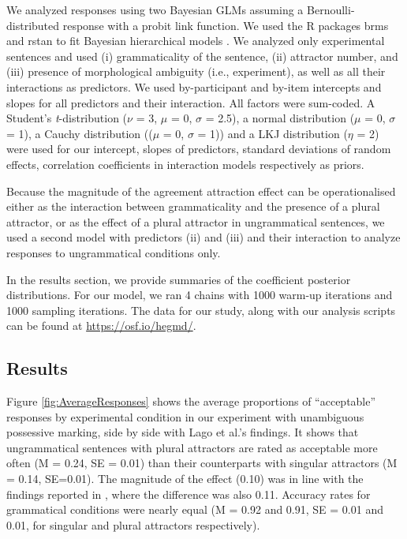 \documentclass[]{interact}\usepackage[]{graphicx}\usepackage[]{color}
\theoremstyle{plain}%
\theoremstyle{definition}
\theoremstyle{remark}
\newcommand{\rev}[1]{{\color{red}#1}}
\begin{document}
We analyzed responses using two Bayesian GLMs assuming a Bernoulli-distributed response with a probit link function.  We used the R packages brms \citep{brms} and rstan \citep{rstan} to fit Bayesian hierarchical models \citep[e.g.,][]{GelmanHill:2007, NicenboimVasishth:2016}. 
We analyzed only experimental sentences and used (i) grammaticality of the sentence, (ii) attractor number, and (iii) presence of morphological ambiguity (i.e., experiment), as well as all their interactions as predictors. We used by-participant and by-item intercepts and slopes for all predictors and \rev{their interaction}. 
All factors were sum-coded. \rev{A Student's \emph{t}-distribution ($\nu$ = 3, $\mu$ = 0, $\sigma$ = 2.5), a normal distribution ($\mu$ = 0, $\sigma$ = 1), a Cauchy distribution (($\mu$ = 0, $\sigma$ = 1)) and a LKJ distribution ($\eta$ = 2) were used for our intercept, slopes of predictors, standard deviations of random effects, correlation coefficients in interaction models respectively as priors.}

Because the magnitude of the agreement attraction effect can be operationalised either as the interaction between grammaticality and the presence of a plural attractor, or as the effect of a plural attractor in ungrammatical sentences, we used a second model with predictors (ii) and (iii) and their interaction to analyze responses to ungrammatical conditions only.


In the results section, we provide summaries of the coefficient posterior distributions. For our model, we ran 4 chains with 1000 warm-up iterations and 1000 sampling iterations. The data for our study, along with our analysis scripts can be found at \url{https://osf.io/hegmd/}.

\subsection{Results}

Figure \ref{fig:AverageResponses} shows the average proportions of ``acceptable'' responses by experimental condition in our experiment with unambiguous possessive marking, side by side with Lago et al.'s findings. It shows that ungrammatical sentences with plural attractors are rated as acceptable more often (M = 0.24, SE = 0.01) than their counterparts with singular attractors (M = 0.14, SE=0.01). The magnitude of the effect (0.10) was in line with the findings reported in \citet{LagoEtAl:2019}, where the difference was also 0.11. Accuracy rates for grammatical conditions were nearly equal (M = 0.92 and 0.91, SE = 0.01 and 0.01, for singular and plural attractors respectively).
\end{document}
